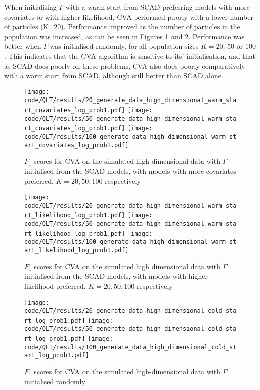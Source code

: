 \documentclass{amsart}[12pt]
\begin{document}
When initialising $\Gamma$ with a warm start from SCAD preferring models with more covariates or with higher
likelihood, CVA performed poorly with a lower number of particles (K=$20$). Performance improved as the number
of particles in the population was increased, as can be seen in Figures
\ref{fig:highdim_warm_start_covariates} and \ref{fig:highdim_warm_start_likelihood}. Performance was better
when $\Gamma$ was initialised randomly, for all population sizes $K=20$, $50$ or $100$. This indicates that
the CVA algorithm is sensitive to its' initialisation, and that as SCAD does poorly on these problems, CVA
also does poorly comparatively with a warm start from SCAD, although still better than SCAD alone.

\begin{figure}\label{fig:highdim_warm_start_covariates}
\caption{$F_1$ scores for CVA on the simulated high dimensional data with $\Gamma$ initialised from the SCAD models, with models with more covariates preferred. $K=20, 50, 100$ respectively}
\texttt{[image: code/QLT/results/20\_generate\_data\_high\_dimensional\_warm\_start\_covariates\_log\_prob1.pdf]}
\texttt{[image: code/QLT/results/50\_generate\_data\_high\_dimensional\_warm\_start\_covariates\_log\_prob1.pdf]}
\texttt{[image: code/QLT/results/100\_generate\_data\_high\_dimensional\_warm\_start\_covariates\_log\_prob1.pdf]}
\end{figure}

\begin{figure}\label{fig:highdim_warm_start_likelihood}
\caption{$F_1$ scores for CVA on the simulated high dimensional data with $\Gamma$ initialised from the SCAD models, with models with higher likelihood preferred. $K=20, 50, 100$ respectively}
\texttt{[image: code/QLT/results/20\_generate\_data\_high\_dimensional\_warm\_start\_likelihood\_log\_prob1.pdf]}
\texttt{[image: code/QLT/results/50\_generate\_data\_high\_dimensional\_warm\_start\_likelihood\_log\_prob1.pdf]}
\texttt{[image: code/QLT/results/100\_generate\_data\_high\_dimensional\_warm\_start\_likelihood\_log\_prob1.pdf]}
\end{figure}

\begin{figure}\label{fig:highdim_cold_start}
\caption{$F_1$ scores for CVA on the simulated high-dimensional data with $\Gamma$ initialised randomly}
\texttt{[image: code/QLT/results/20\_generate\_data\_high\_dimensional\_cold\_start\_log\_prob1.pdf]}
\texttt{[image: code/QLT/results/50\_generate\_data\_high\_dimensional\_cold\_start\_log\_prob1.pdf]}
\texttt{[image: code/QLT/results/100\_generate\_data\_high\_dimensional\_cold\_start\_log\_prob1.pdf]}
\end{figure}
\end{document}
